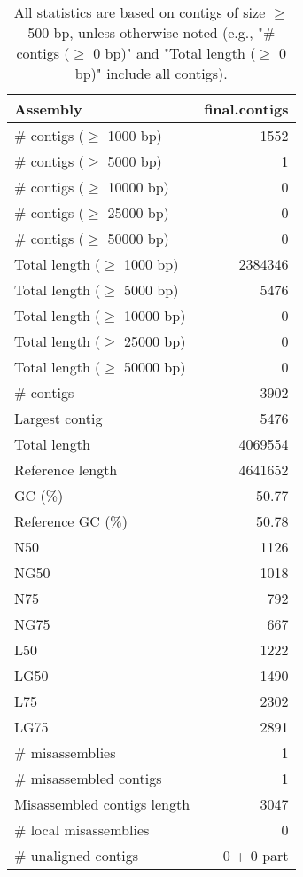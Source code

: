 \documentclass[12pt,a4paper]{article}
\begin{document}
\begin{table}[ht]
\begin{center}
\caption{All statistics are based on contigs of size $\geq$ 500 bp, unless otherwise noted (e.g., "\# contigs ($\geq$ 0 bp)" and "Total length ($\geq$ 0 bp)" include all contigs).}
\begin{tabular}{|l*{1}{|r}|}
\hline
Assembly & final.contigs \\ \hline
\# contigs ($\geq$ 1000 bp) & 1552 \\ \hline
\# contigs ($\geq$ 5000 bp) & 1 \\ \hline
\# contigs ($\geq$ 10000 bp) & 0 \\ \hline
\# contigs ($\geq$ 25000 bp) & 0 \\ \hline
\# contigs ($\geq$ 50000 bp) & 0 \\ \hline
Total length ($\geq$ 1000 bp) & 2384346 \\ \hline
Total length ($\geq$ 5000 bp) & 5476 \\ \hline
Total length ($\geq$ 10000 bp) & 0 \\ \hline
Total length ($\geq$ 25000 bp) & 0 \\ \hline
Total length ($\geq$ 50000 bp) & 0 \\ \hline
\# contigs & 3902 \\ \hline
Largest contig & 5476 \\ \hline
Total length & 4069554 \\ \hline
Reference length & 4641652 \\ \hline
GC (\%) & 50.77 \\ \hline
Reference GC (\%) & 50.78 \\ \hline
N50 & 1126 \\ \hline
NG50 & 1018 \\ \hline
N75 & 792 \\ \hline
NG75 & 667 \\ \hline
L50 & 1222 \\ \hline
LG50 & 1490 \\ \hline
L75 & 2302 \\ \hline
LG75 & 2891 \\ \hline
\# misassemblies & 1 \\ \hline
\# misassembled contigs & 1 \\ \hline
Misassembled contigs length & 3047 \\ \hline
\# local misassemblies & 0 \\ \hline
\# unaligned contigs & 0 + 0 part \\ \hline

\end{tabular}
\end{center}
\end{table}
\end{document}
